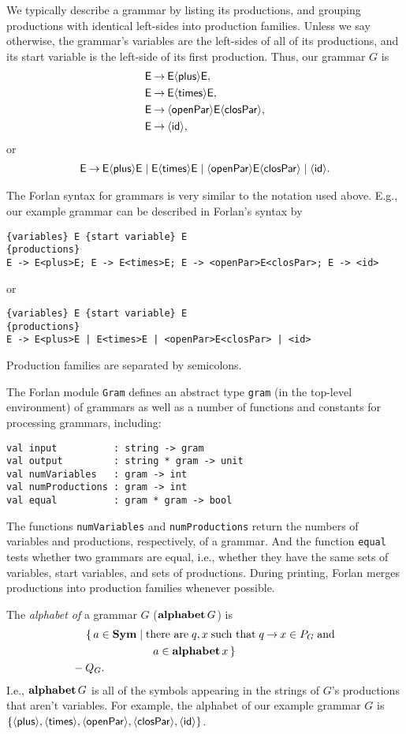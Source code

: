 We typically describe a grammar by listing its productions, and
grouping productions with identical left-sides into production
families.  Unless we say otherwise, the grammar's variables are the
left-sides of all of its productions, and its start variable is the
left-side of its first production.
Thus, our grammar $G$ is
\begin{align*}
\mathsf{E} &\mathbin{\to} \mathsf{E}{\langle\mathsf{plus}\rangle}\mathsf{E} , \\
\mathsf{E} &\mathbin{\to} \mathsf{E}{\langle\mathsf{times}\rangle}\mathsf{E} , \\
\mathsf{E} &\mathbin{\to} {\langle\mathsf{openPar}\rangle}\mathsf{E}{\langle\mathsf{closPar}\rangle} , \\
\mathsf{E} &\mathbin{\to} {\langle\mathsf{id}\rangle} ,
\end{align*}
or
\begin{gather*}
\mathsf{E\mathbin{\to} E{\langle\mathsf{plus}\rangle} E\mid E{\langle\mathsf{times}\rangle} E\mid {\langle\mathsf{openPar}\rangle} E{\langle\mathsf{closPar}\rangle} \mid
{\langle\mathsf{id}\rangle}} .
\end{gather*}

The Forlan syntax for grammars is very similar to the notation used
above.  E.g., our example grammar can be described in Forlan's syntax
by
\begin{verbatim}
{variables} E {start variable} E
{productions}
E -> E<plus>E; E -> E<times>E; E -> <openPar>E<closPar>; E -> <id>
\end{verbatim}
or
\begin{verbatim}
{variables} E {start variable} E
{productions}
E -> E<plus>E | E<times>E | <openPar>E<closPar> | <id>
\end{verbatim}
Production families are separated by semicolons.

The Forlan module \texttt{Gram} defines an abstract type \texttt{gram} (in
the top-level environment) of grammars as well as a number of
functions and constants for processing grammars, including:
\begin{verbatim}
val input          : string -> gram
val output         : string * gram -> unit 
val numVariables   : gram -> int
val numProductions : gram -> int
val equal          : gram * gram -> bool
\end{verbatim}
The functions \texttt{numVariables} and \texttt{numProductions} return
the numbers of variables and productions, respectively, of a grammar.
And the function \texttt{equal} tests whether two grammars are equal,
i.e., whether they have the same sets of variables, start variables,
and sets of productions.
During printing, Forlan merges productions into production families
whenever possible.

The \emph{alphabet of} a grammar $G$ ($\mathbf{alphabet}\,G$) is
\begin{align*}
&\quad\; \{\,a\in\mathbf{Sym}\mid\allowbreak\mbox{there are}\allowbreak\;q,x\;\allowbreak\mbox{such that}\allowbreak\;q\mathbin{\to} x\in P_G
\;\allowbreak\mbox{and}\allowbreak\; \\
&\hspace{2.6cm} a\in\mathbf{alphabet}\,x \,\} \\
&- Q_G .
\end{align*}
I.e., $\mathbf{alphabet}\,G$ is all of the symbols appearing in the strings of
$G$'s productions that aren't variables.
For example, the alphabet of our example grammar $G$ is
$\{\mathsf{{\langle\mathsf{plus}\rangle},{\langle\mathsf{times}\rangle},{\langle\mathsf{openPar}\rangle},{\langle\mathsf{closPar}\rangle},{\langle\mathsf{id}\rangle}}\}$.

